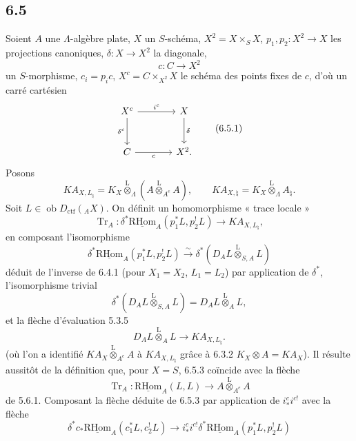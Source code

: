 \documentclass[11pt]{article}
\newcommand{\R}{\mathrm{R}}\newcommand{\RHomCore}{\mathrm{RHom}}
\providecommand{\RHom}{\RHomCore}
\providecommand{\uRHom}{\underline{\RHom}}
\providecommand{\Tr}{\operatorname{Tr}}
\providecommand{\Tr}{\operatorname{Tr}}
\providecommand{\lten}{\overset{\mathrm L}{\otimes}}
\providecommand{\Ob}{\operatorname{ob}}
\providecommand{\Tr}{\operatorname{Tr}}
\providecommand{\RHom}{\RHomCore}
\providecommand{\lten}{\overset{\mathrm L}{\otimes}}
\providecommand{\RHom}{\R\mathcal{H}om}
\providecommand{\lten}{\overset{\mathrm L}{\otimes}}
\providecommand{\Ob}{\operatorname{ob}}
\providecommand{\R}{\mathrm R}
\providecommand{\Tr}{\operatorname{Tr}}
\providecommand{\lten}{\overset{\mathrm L}{\otimes}}
\providecommand{\lten}{\overset{\mathrm L}{\otimes}}
\providecommand{\Ob}{\operatorname{Ob}}
\providecommand{\lten}{\overset{\mathrm L}{\otimes}}
\providecommand{\RHom}{\RHomCore}
\providecommand{\Tr}{\operatorname{Tr}}
\providecommand{\Ob}{\operatorname{ob}}
\providecommand{\Ob}{\operatorname{Ob}}
\providecommand{\lten}{\overset{\mathrm L}{\otimes}}
\begin{document}
\subsection*{6.5}
Soient $A$ une $\Lambda$-algèbre plate, $X$ un $S$-schéma, $X^2=X\times_SX$, $p_1,p_2:X^2\to X$ les projections canoniques, $\delta:X\to X^2$ la diagonale,
\[
c:C\longrightarrow X^2
\]
un $S$-morphisme, $c_i=p_ic$, $X^c=C\times_{X^2}X$ le schéma des points fixes de $c$, d'où un carré cartésien
\begin{equation}
\begin{tikzcd}[column sep=large,row sep=large]
X^c \arrow[r,"i^c"] \arrow[d,"\delta^c"'] & X \arrow[d,"\delta"]\\
C \arrow[r,"c"'] & X^2 .
\end{tikzcd}
\tag{6.5.1}
\end{equation}
Posons
\begin{equation}
KA_{X,L_{\natural}}=K_X\lten_{\Lambda}(A\lten_{A^e}A),
\qquad
KA_{X,\natural}=K_X\lten_{\Lambda}A_{\natural}.
\tag{6.5.2}
\end{equation}
Soit $L\in\Ob D_{\mathrm{ctf}}({}_AX)$. On définit un homomorphisme « trace locale »
\begin{equation}
\Tr_A:\delta^*\uRHom_A(p_1^*L,p_2^!L)
\longrightarrow
KA_{X,L_{\natural}},
\tag{6.5.3}
\end{equation}
en composant l'isomorphisme
\begin{equation}
\delta^*\uRHom_A(p_1^*L,p_2^!L)
\xrightarrow{\sim}
\delta^*(D_AL\lten_{S,A}L)
\tag{6.5.4}
\end{equation}
déduit de l'inverse de 6.4.1 (pour $X_1=X_2$, $L_1=L_2$) par application de $\delta^*$, l'isomorphisme trivial
\begin{equation}
\delta^*(D_AL\lten_{S,A}L)=D_AL\lten_AL,
\tag{6.5.5}
\end{equation}
et la flèche d'évaluation 5.3.5
\begin{equation}
D_AL\lten_AL\longrightarrow KA_{X,L_{\natural}}.
\tag{6.5.6}
\end{equation}
(où l'on a identifié $KA_X\lten_{A^e}A$ à $KA_{X,L_{\natural}}$ grâce à 6.3.2 $K_X\otimes A=KA_X$). Il résulte aussitôt de la définition que, pour $X=S$, 6.5.3 coïncide avec la flèche
\[
\Tr_A:\uRHom_A(L,L)\longrightarrow A\lten_{A^e}A
\]
de 5.6.1. Composant la flèche déduite de 6.5.3 par application de $i_*^ci^{c!}$ avec la flèche
\begin{equation}
\delta^*c_*\uRHom_A(c_1^*L,c_2^!L)
\longrightarrow
i_*^ci^{c!}\delta^*\uRHom_A(p_1^*L,p_2^!L)
\tag{6.5.7}
\end{equation}
\end{document}
